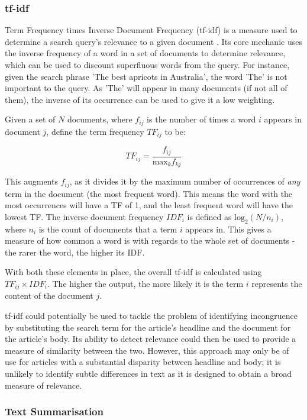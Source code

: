 \subsubsection{tf-idf}\label{lit:tfidf}
Term Frequency times Inverse Document Frequency (tf-idf) is a measure used to determine a search query's relevance to a given document \cite{Rajaraman2011}. Its core mechanic uses the inverse frequency of a word in a set of documents to determine relevance, which can be used to discount superfluous words from the query. For instance, given the search phrase 'The best apricots in Australia', the word 'The' is not important to the query. As 'The' will appear in many documents (if not all of them), the inverse of its occurrence can be used to give it a low weighting. 

Given a set of \(N\) documents, where \(f_{ij}\) is the number of times a word \(i\) appears in document \(j\), \citeauthor{Rajaraman2011} define the term frequency \(TF_{ij}\) to be:

\[TF_{ij} = \frac{f_{ij}}{\textrm{max}_k f_{kj}}\]

This augments \(f_{ij}\), as it divides it by the maximum number of occurrences of \textit{any} term in the document (the most frequent word). This means the word with the most occurrences will have a TF of 1, and the least frequent word will have the lowest TF. The inverse document frequency \(IDF_i\) is defined as \(\textrm{log}_2(N/n_i)\), where \(n_i\) is the count of documents that a term \(i\) appears in. This gives a measure of how common a word is with regards to the whole set of documents - the rarer the word, the higher its IDF.

With both these elements in place, the overall tf-idf is calculated using \(TF_{ij} \times IDF_i\). The higher the output, the more likely it is the term \(i\) represents the content of the document \(j\).

tf-idf could potentially be used to tackle the problem of identifying incongruence by substituting the search term for the article's headline and the document for the article's body. Its ability to detect relevance could then be used to provide a measure of similarity between the two. However, this approach may only be of use for articles with a substantial disparity between headline and body; it is unlikely to identify subtle differences in text as it is designed to obtain a broad measure of relevance.


\subsubsection{Text Summarisation}

